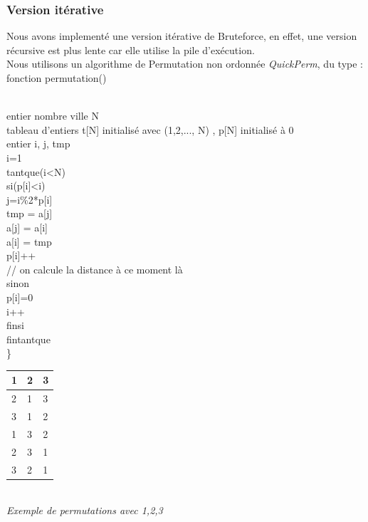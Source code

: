 \documentclass[12pt]{report}
\begin{document}
\subsubsection{Version itérative}

Nous avons implementé une version itérative de Bruteforce, en effet, une version récursive est plus lente car elle utilise la pile d'exécution.\\

Nous utilisons un algorithme de Permutation non ordonnée \textit{QuickPerm}, du type :\\

\noindent fonction permutation(){ \\
\indent entier nombre ville N \\
\indent tableau d'entiers t[N] initialisé avec (1,2,..., N) , p[N] initialisé à 0 \\
\indent entier i, j, tmp \\
\indent i=1\\
\indent tantque(i<N)\\
\indent\indent si(p[i]<i)\\
\indent\indent\indent j=i\%2*p[i]\\
\indent\indent\indent tmp = a[j]\\
\indent\indent\indent a[j] = a[i]\\
\indent\indent\indent a[i] = tmp\\
\indent\indent\indent p[i]++\\
\indent\indent\indent // on calcule la distance à ce moment là\\
\indent\indent sinon\\
\indent\indent\indent p[i]=0\\
\indent\indent\indent i++\\
\indent\indent finsi \\
\indent fintantque\\
\}\\


    \begin{tabular}{|l|l|l|}
    \hline
    1 & 2 & 3 \\ \hline
    2 & 1 & 3 \\ \hline
    3 & 1 & 2 \\ \hline
    1 & 3 & 2 \\ \hline
    2 & 3 & 1 \\ \hline
    3 & 2 & 1 \\ \hline
    \end{tabular}\\
\textit{Exemple de permutations avec 1,2,3 \\}

}
\end{document}
